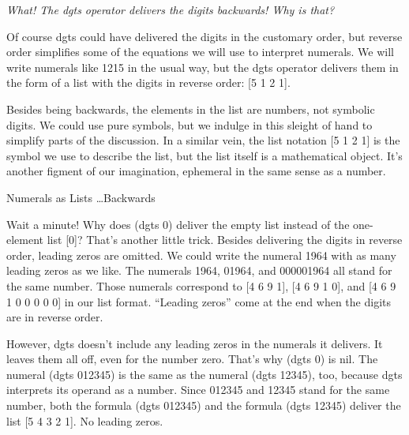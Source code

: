 \begin{aside}
\emph{What! The \textsf{dgts} operator delivers the digits backwards! Why is that?}

Of course
\textsf{dgts}
could have delivered the digits in the
customary order, but reverse order simplifies some of the
equations we will use to interpret numerals.
We will write numerals like 1215 in the usual way, but
the \textsf{dgts} operator delivers them in the form of
a list with the digits in reverse order: \textsf{[5 1 2 1]}.

Besides being backwards, the elements in the list are numbers,
not symbolic digits.
We could use pure symbols, but we indulge in
this sleight of hand to
simplify parts of the discussion.
In a similar vein, the list notation \textsf{[5 1 2 1]} is the symbol we use
to describe the
list,
but the list itself is a mathematical object.
It's another figment of our imagination,
ephemeral in the same sense as a number.
\caption{Numerals as Lists \dots Backwards}
\label{numeral-as-sequence}
\end{aside}

Wait a minute!
Why does \textsf{(dgts 0)} deliver the empty list
instead of the one-element list \textsf{[0]}?
That's another little trick.
Besides delivering the digits in reverse order,
leading zeros are omitted.
We could write the numeral 1964 with as many leading zeros as we like.
The numerals 1964, 01964, and 000001964 all stand for the same number.
Those numerals correspond to
\textsf{[4 6 9 1]}, \textsf{[4 6 9 1 0]}, and \textsf{[4 6 9 1 0 0 0 0 0]}
in our list format. ``Leading zeros'' come at the end when the
digits are in reverse order.

However, \textsf{dgts} doesn't include any
 leading zeros
in the numerals it delivers.
It leaves them all off, even for the number zero.
That's why \textsf{(dgts 0)} is \textsf{nil}.
The numeral \textsf{(dgts 012345)} is
the same as the numeral \textsf{(dgts 12345)}, too,
because \textsf{dgts} interprets its operand as a number.
Since 012345 and 12345 stand for the same number,
both the formula \textsf{(dgts 012345)} and the formula \textsf{(dgts 12345)}
deliver the list \textsf{[5 4 3 2 1]}.
No leading zeros.

